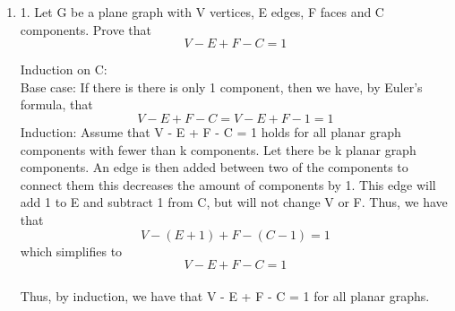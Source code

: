 \documentclass[12pt]{article}
\begin{document}
  
\pagestyle{empty}
 




%
%
%





\begin{enumerate}
\item
1. Let G be a plane graph with V vertices, E edges, F faces and C components.
Prove that $$V - E + F - C = 1$$

Induction on C:\\

Base case: If there is there is only 1 component, then we have, by Euler's formula, that $$V - E + F - C = V - E + F - 1 = 1$$
Induction: Assume that V - E + F - C = 1 holds for all planar graph components with fewer than k components. 
Let there be k planar graph components. An edge is then added between two of the components to connect them this decreases the amount of components by 1. 
This edge will add 1 to E and subtract 1 from C, but will not change V or F. Thus, we have that\\ 
$$V - (E + 1) + F - (C - 1) = 1$$
which simplifies to\\
$$V - E + F - C = 1$$\\
Thus, by induction, we have that V - E + F - C = 1 for all planar graphs.\\



\end{enumerate} 
\end{document}
